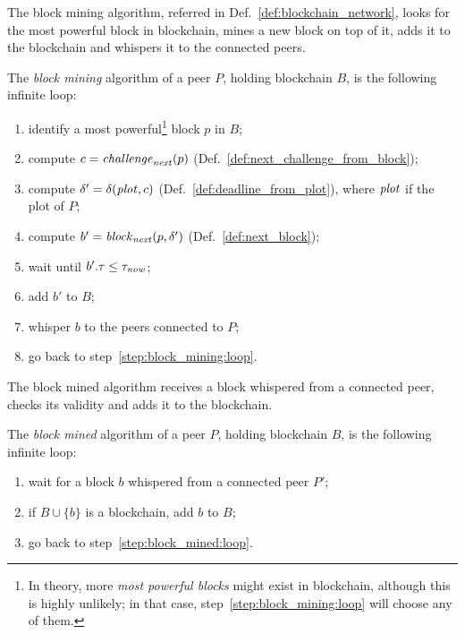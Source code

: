 The block mining algorithm, referred in Def.~\ref{def:blockchain_network},
looks for the most powerful block in blockchain,
mines a new block on top of it, adds it to the blockchain and whispers it to the connected peers.
%
\begin{alg}\label{alg:block_mining}
  The \emph{block mining} algorithm of a peer $P$, holding blockchain $B$,
  is the following infinite loop:
  \begin{enumerate}
  \item\label{step:block_mining:loop} identify a most powerful\footnote{In theory, more \emph{most powerful blocks} might exist in blockchain, although this is highly unlikely; in that case, step~\ref{step:block_mining:loop} will choose any of them.} block $p$ in $B$;
  \item\label{step:block_mining:next_challenge} compute $c={\mathit{challenge}}_{\mathit{next}}(p)$ (Def.~\ref{def:next_challenge_from_block});
  \item\label{step:block_mining:next_deadline} compute $\delta'=\delta({\mathit{plot}},c)$ (Def.~\ref{def:deadline_from_plot}), where ${\mathit{plot}}$
    if the plot of $P$;
  \item\label{step:block_mining:next_block} compute $b'={\mathit{block}}_{\mathit{next}}(p,\delta')$ (Def.~\ref{def:next_block});
  \item\label{step:block_mining:wait} wait until $b'.\tau\le\tau_{\mathit{now}}$;
  \item\label{step:block_mining:add} add $b'$ to $B$;
  \item whisper $b$ to the peers connected to $P$;
  \item go back to step~\ref{step:block_mining:loop}.
  \end{enumerate}
\end{alg}
%
The block mined algorithm receives a block whispered from a connected peer, checks its validity
and adds it to the blockchain.
%
\begin{alg}\label{alg:block_mined}
  The \emph{block mined} algorithm of a peer $P$, holding blockchain $B$,
  is the following infinite loop:
  \begin{enumerate}
  \item\label{step:block_mined:loop} wait for a block $b$ whispered from a connected peer $P'$;
  \item\label{step:block_mined:add} if $B\cup\{b\}$ is a blockchain, add $b$ to $B$;
  \item go back to step~\ref{step:block_mined:loop}.
  \end{enumerate}
\end{alg}
